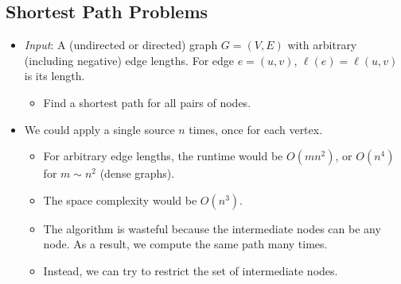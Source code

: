 \documentclass[12pt]{article}
\begin{document}
\subsection{Shortest Path Problems}
\begin{itemize}
    \item \textit{Input}: A (undirected or directed) graph $G = (V, E)$ with arbitrary (including negative) edge lengths. For edge $e = (u, v)$, $\ell(e) = \ell(u, v)$ is its length.
    \begin{itemize}
        \item Find a shortest path for all pairs of nodes.
    \end{itemize}
    \item We could apply a single source $n$ times, once for each vertex.
    \begin{itemize}
        \item For arbitrary edge lengths, the runtime would be $O(mn^2)$, or $O(n^4)$ for $m \sim n^2$ (dense graphs).
        \item The space complexity would be $O(n^3)$.
        \item The algorithm is wasteful because the intermediate nodes can be any node. As a result, we compute the same path many times.
        \item Instead, we can try to restrict the set of intermediate nodes.
    \end{itemize}
\end{itemize}
\end{document}
